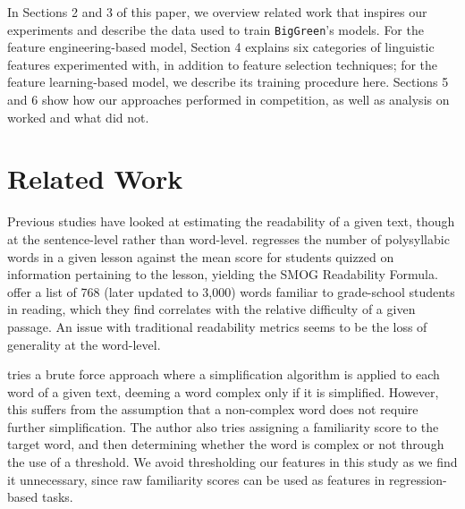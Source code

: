 \documentclass{dcthesis}
\theoremstyle{definition}
\theoremstyle{remark}
\begin{document}
In Sections 2 and 3 of this paper, we overview related work that inspires our experiments and describe the data used to train \texttt{BigGreen}'s models. For the feature engineering-based model, Section 4 explains six categories of linguistic features experimented with, in addition to feature selection techniques; for the feature learning-based model, we describe its training procedure here. Sections 5 and 6 show how our approaches performed in competition, as well as analysis on worked and what did not.

\chapter{Related Work}

Previous studies have looked at estimating the readability of a given text, though at the sentence-level rather than word-level. \citet{mc1969smog} regresses the number of polysyllabic words in a given lesson against the mean score for students quizzed on information pertaining to the lesson, yielding the SMOG Readability Formula. \citet{dale1948formula} offer a list of 768 (later updated to 3,000) words familiar to grade-school students in reading, which they find correlates with the relative difficulty of a given passage. An issue with traditional readability metrics seems to be the loss of generality at the word-level.

\citet{shardlow2013comparison} tries a brute force approach where a simplification algorithm is applied to each word of a given text, deeming a word complex only if it is simplified. However, this suffers from the assumption that a non-complex word does not require further simplification. The author also tries assigning a familiarity score to the target word, and then determining whether the word is complex or not through the use of a threshold. We avoid thresholding our features in this study as we find it unnecessary, since raw familiarity scores can be used as features in regression-based tasks. 
\end{document}
